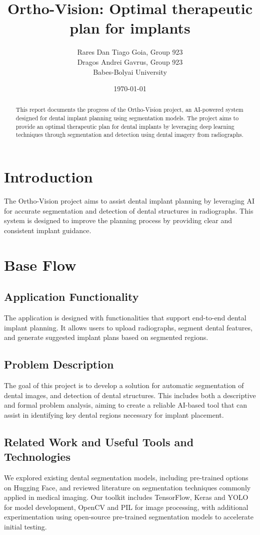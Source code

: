 \documentclass[12pt]{article}
\title{\textbf{Ortho-Vision}: Optimal therapeutic plan for implants}
\author{
    Rares Dan Tiago Goia, Group 923 \\ 
    Dragos Andrei Gavrus, Group 923 \\
    Babes-Bolyai University
}
\date{\today}
\begin{document}
\maketitle

\tableofcontents

\newpage

\begin{abstract}
This report documents the progress of the Ortho-Vision project, an AI-powered system designed for dental implant planning using segmentation models. The project aims to provide an optimal therapeutic plan for dental implants by leveraging deep learning techniques through segmentation and detection using dental imagery from radiographs.
\end{abstract}

\section{Introduction}
The Ortho-Vision project aims to assist dental implant planning by leveraging AI for accurate segmentation and detection of dental structures in radiographs. This system is designed to improve the planning process by providing clear and consistent implant guidance.

\section{Base Flow}
\subsection{Application Functionality}
The application is designed with functionalities that support end-to-end dental implant planning. It allows users to upload radiographs, segment dental features, and generate suggested implant plans based on segmented regions.

\subsection{Problem Description}
The goal of this project is to develop a solution for automatic segmentation of dental images, and detection of dental structures. This includes both a descriptive and formal problem analysis, aiming to create a reliable AI-based tool that can assist in identifying key dental regions necessary for implant placement.

\subsection{Related Work and Useful Tools and Technologies}
We explored existing dental segmentation models, including pre-trained options on Hugging Face, and reviewed literature on segmentation techniques commonly applied in medical imaging. Our toolkit includes TensorFlow, Keras and YOLO for model development, OpenCV and PIL for image processing, with additional experimentation using open-source pre-trained segmentation models to accelerate initial testing.
\end{document}
